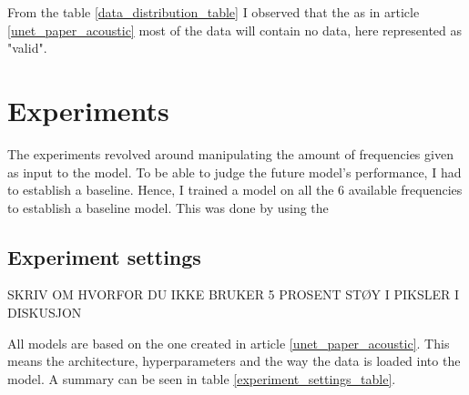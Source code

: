         From the table \ref{data_distribution_table} I observed that the as in article \ref{unet_paper_acoustic} most of the data will contain no data, here represented as "valid". 
        
\section{Experiments}
    The experiments revolved around manipulating the amount of frequencies given as input to the model. To be able to judge the future model's performance, I had to establish a baseline. Hence, I trained a model on all the 6 available frequencies to establish a baseline model. This was done by using the 
    
    \subsection{Experiment settings}
        SKRIV OM HVORFOR DU IKKE BRUKER 5 PROSENT STØY I PIKSLER I DISKUSJON
        
        All models are based on the one created in article \ref{unet_paper_acoustic}. This means the architecture, hyperparameters and the way the data is loaded into the model. A summary can be seen in table \ref{experiment_settings_table}.
        

